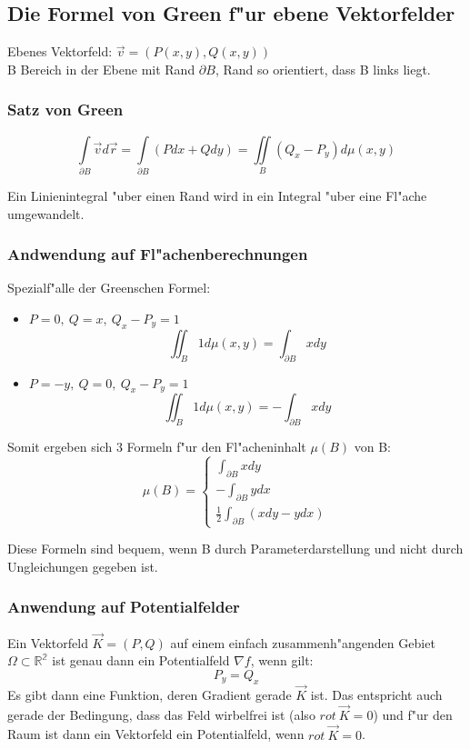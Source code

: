 \documentclass[10pt, a4paper, twocolumn]{scrartcl}
\begin{document}
\subsection{Die Formel von Green f"ur ebene Vektorfelder}

Ebenes Vektorfeld: $\vec{v}=(P(x,y),Q(x,y))$\\

B Bereich in der Ebene mit Rand $\partial B$, Rand so orientiert, dass B links liegt.\\

\subsubsection{Satz von Green}

$$\int\limits_{\partial B}\vec{v}d\vec{r}=\int\limits_{\partial B}(Pdx +Qdy)=\iint\limits_B(Q_x-P_y)d\mu(x,y)$$

Ein Linienintegral "uber einen Rand wird in ein Integral "uber eine Fl"ache umgewandelt.

\subsubsection{Andwendung auf Fl"achenberechnungen}

Spezialf"alle der Greenschen Formel:
\begin{itemize}
 \item $P=0,\:Q=x,\:Q_x-P_y=1$
  $$\iint_B 1 d\mu(x,y)=\int_{\partial B}xdy$$
 \item $P=-y,\:Q=0,\:Q_x-P_y=1$
  $$\iint_B 1 d\mu(x,y)=-\int_{\partial B}xdy$$
\end{itemize}

Somit ergeben sich 3 Formeln f"ur den Fl"acheninhalt $\mu(B)$ von B:
$$\mu(B)=\left\{
\begin{array}{l}
 \int_{\partial B}xdy\\
 -\int_{\partial B}ydx\\
 \frac{1}{2}\int_{\partial B}(xdy-ydx)
\end{array}
\right.
$$

Diese Formeln sind bequem, wenn B durch Parameterdarstellung und nicht durch Ungleichungen gegeben ist.

\subsubsection{Anwendung auf Potentialfelder}

Ein Vektorfeld $\vec{K}=(P,Q)$ auf einem einfach zusammenh"angenden Gebiet $\Omega\subset \mathbb{R^2}$ ist genau dann ein Potentialfeld $\nabla f$, wenn gilt:
$$P_y=Q_x$$
Es gibt dann eine Funktion, deren Gradient gerade $\vec{K}$ ist. Das entspricht auch gerade der Bedingung, dass das Feld wirbelfrei ist (also $rot\:\vec{K}=0$) und f"ur den Raum ist dann ein Vektorfeld ein Potentialfeld, wenn $rot\:\vec{K}=0$.\\
\end{document}
